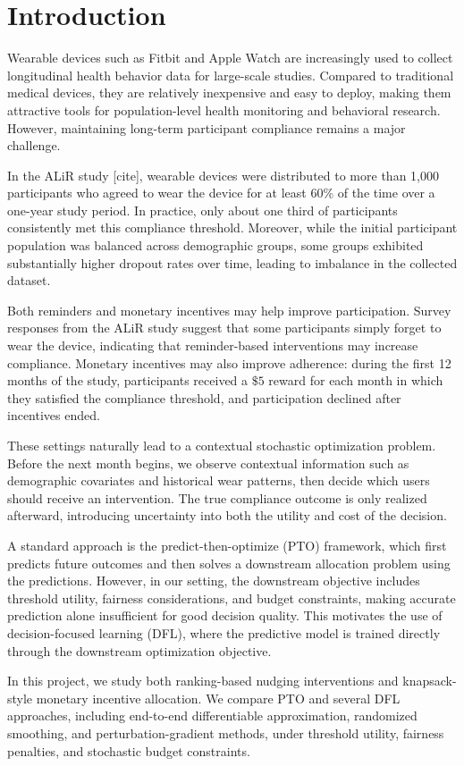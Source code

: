 \section{Introduction}

Wearable devices such as Fitbit and Apple Watch are increasingly used to collect longitudinal health behavior data for large-scale studies. Compared to traditional medical devices, they are relatively inexpensive and easy to deploy, making them attractive tools for population-level health monitoring and behavioral research. However, maintaining long-term participant compliance remains a major challenge.

In the ALiR study [cite], wearable devices were distributed to more than 1,000 participants who agreed to wear the device for at least 60\% of the time over a one-year study period. In practice, only about one third of participants consistently met this compliance threshold. Moreover, while the initial participant population was balanced across demographic groups, some groups exhibited substantially higher dropout rates over time, leading to imbalance in the collected dataset.

Both reminders and monetary incentives may help improve participation. Survey responses from the ALiR study suggest that some participants simply forget to wear the device, indicating that reminder-based interventions may increase compliance. Monetary incentives may also improve adherence: during the first 12 months of the study, participants received a $\$5$ reward for each month in which they satisfied the compliance threshold, and participation declined after incentives ended.

These settings naturally lead to a contextual stochastic optimization problem. Before the next month begins, we observe contextual information such as demographic covariates and historical wear patterns, then decide which users should receive an intervention. The true compliance outcome is only realized afterward, introducing uncertainty into both the utility and cost of the decision.

A standard approach is the predict-then-optimize (PTO) framework, which first predicts future outcomes and then solves a downstream allocation problem using the predictions. However, in our setting, the downstream objective includes threshold utility, fairness considerations, and budget constraints, making accurate prediction alone insufficient for good decision quality. This motivates the use of decision-focused learning (DFL), where the predictive model is trained directly through the downstream optimization objective.

In this project, we study both ranking-based nudging interventions and knapsack-style monetary incentive allocation. We compare PTO and several DFL approaches, including end-to-end differentiable approximation, randomized smoothing, and perturbation-gradient methods, under threshold utility, fairness penalties, and stochastic budget constraints.
